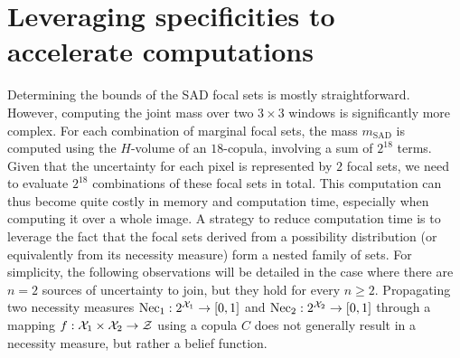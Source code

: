 \section{Leveraging specificities to accelerate computations}

Determining the bounds of the SAD focal sets is mostly straightforward. However, computing the joint mass over two $3 \times 3$ windows is significantly more complex. For each combination of marginal focal sets, the mass $m_{\mathrm{SAD}}$ is computed using the $H$-volume of an $18$-copula, involving a sum of $2^{18}$ terms. Given that the uncertainty for each pixel is represented by $2$ focal sets, we need to evaluate $2^{18}$ combinations of these focal sets in total. This computation can thus become quite costly in memory and computation time, especially when computing it over a whole image. A strategy to reduce computation time is to leverage the fact that the focal sets derived from a possibility distribution (or equivalently from its necessity measure) form a nested family of sets. For simplicity, the following observations will be detailed in the case where there are $n=2$ sources of uncertainty to join, but they hold for every $n\geqslant2$. Propagating two necessity measures $\mathrm{Nec}_1:2^{{\mathcal{X}}_1} \rightarrow [0,1]$ and $\mathrm{Nec}_2: 2^{{\mathcal{X}}_2} \rightarrow [0,1]$ through a mapping $f: {\mathcal{X}}_1 \times {\mathcal{X}}_2 \rightarrow \mathcal{Z}$ using a copula $C$ does not generally result in a necessity measure, but rather a belief function.

